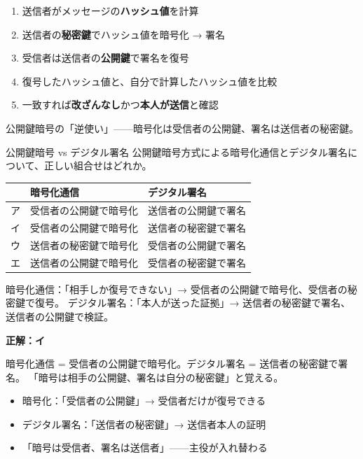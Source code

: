 \begin{teigi}[デジタル署名の仕組み]
\begin{enumerate}
  \item 送信者がメッセージの\textbf{ハッシュ値}を計算
  \item 送信者の\textbf{秘密鍵}でハッシュ値を暗号化 → 署名
  \item 受信者は送信者の\textbf{公開鍵}で署名を復号
  \item 復号したハッシュ値と、自分で計算したハッシュ値を比較
  \item 一致すれば\textbf{改ざんなし}かつ\textbf{本人が送信}と確認
\end{enumerate}
公開鍵暗号の「逆使い」——暗号化は受信者の公開鍵、署名は送信者の秘密鍵。
\end{teigi}

\begin{reidai}{公開鍵暗号 vs デジタル署名}
公開鍵暗号方式による暗号化通信とデジタル署名について、正しい組合せはどれか。

\begin{center}
\small
\begin{tabular}{lll}
\toprule
 & 暗号化通信 & デジタル署名 \\
\midrule
ア & 受信者の公開鍵で暗号化 & 送信者の公開鍵で署名 \\
イ & 受信者の公開鍵で暗号化 & 送信者の秘密鍵で署名 \\
ウ & 送信者の秘密鍵で暗号化 & 受信者の公開鍵で署名 \\
エ & 送信者の公開鍵で暗号化 & 受信者の秘密鍵で署名 \\
\bottomrule
\end{tabular}
\end{center}

\end{reidai}

\begin{shishin}
暗号化通信：「相手しか復号できない」→ 受信者の公開鍵で暗号化、受信者の秘密鍵で復号。
デジタル署名：「本人が送った証拠」→ 送信者の秘密鍵で署名、送信者の公開鍵で検証。
\end{shishin}

\begin{kaitou}
\textbf{正解：イ}

暗号化通信 = 受信者の公開鍵で暗号化。デジタル署名 = 送信者の秘密鍵で署名。
「暗号は相手の公開鍵、署名は自分の秘密鍵」と覚える。
\end{kaitou}

\begin{minuki}[見抜き方]
\begin{itemize}
  \item 暗号化：「受信者の公開鍵」→ 受信者だけが復号できる
  \item デジタル署名：「送信者の秘密鍵」→ 送信者本人の証明
  \item 「暗号は受信者、署名は送信者」——主役が入れ替わる
\end{itemize}
\end{minuki}

